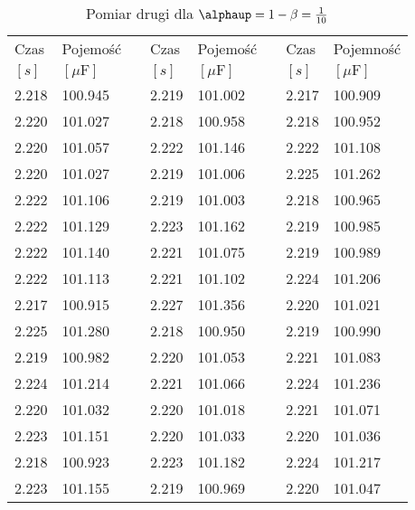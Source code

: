 \documentclass[12pt]{mwrep}
\let\alpha\alphaup
\begin{document}
	\begin{table}[H]\caption{Pomiar drugi dla $\alpha=1-\beta=\frac{1}{10}$}\label{tab:_fake}
		\begin{tabularx}{\textwidth}{|Y|Y|p{2mm}|Y|Y|p{2mm}|Y|Y|}
			Czas & Pojemość && Czas & Pojemość && Czas & Pojemność \\
			$[s]$ & $[\mu\text{F}]$ && $[s]$ & $[\mu\text{F}]$ && $[s]$ & $[\mu\text{F}]$ \\
			2.218 & 100.945 && 2.219 & 101.002 && 2.217 & 100.909 \\
			2.220 & 101.027 && 2.218 & 100.958 && 2.218 & 100.952 \\
			2.220 & 101.057 && 2.222 & 101.146 && 2.222 & 101.108 \\
			2.220 & 101.027 && 2.219 & 101.006 && 2.225 & 101.262 \\
			2.222 & 101.106 && 2.219 & 101.003 && 2.218 & 100.965 \\
			2.222 & 101.129 && 2.223 & 101.162 && 2.219 & 100.985 \\
			2.222 & 101.140 && 2.221 & 101.075 && 2.219 & 100.989 \\
			2.222 & 101.113 && 2.221 & 101.102 && 2.224 & 101.206 \\
			2.217 & 100.915 && 2.227 & 101.356 && 2.220 & 101.021 \\
			2.225 & 101.280 && 2.218 & 100.950 && 2.219 & 100.990 \\
			2.219 & 100.982 && 2.220 & 101.053 && 2.221 & 101.083 \\
			2.224 & 101.214 && 2.221 & 101.066 && 2.224 & 101.236 \\
			2.220 & 101.032 && 2.220 & 101.018 && 2.221 & 101.071 \\
			2.223 & 101.151 && 2.220 & 101.033 && 2.220 & 101.036 \\
			2.218 & 100.923 && 2.223 & 101.182 && 2.224 & 101.217 \\
			2.223 & 101.155 && 2.219 & 100.969 && 2.220 & 101.047 \\

\end{tabularx}
\end{table}
\end{document}
